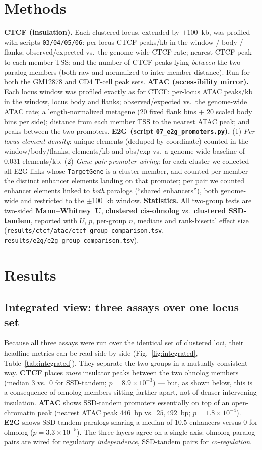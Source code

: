 \documentclass[11pt]{article}
\newcommand{\ohno}{\textcolor{ohno}{\textbf{clustered cis-ohnolog}}}
\newcommand{\ssd}{\textcolor{ssd}{\textbf{clustered SSD-tandem}}}
\begin{document}
\section{Methods}
\textbf{CTCF (insulation).} Each clustered locus, extended by $\pm$100~kb, was profiled with scripts
\texttt{03/04/05/06}: per-locus CTCF peaks/kb in the window / body / flanks; observed/expected vs.\
the genome-wide CTCF rate; nearest CTCF peak to each member TSS; and the number of CTCF peaks lying
\emph{between} the two paralog members (both raw and normalized to inter-member distance). Run for
both the GM12878 and CD4 T-cell peak sets.
\textbf{ATAC (accessibility mirror).} Each locus window was profiled exactly as for CTCF: per-locus
ATAC peaks/kb in the window, locus body and flanks; observed/expected vs.\ the genome-wide ATAC
rate; a length-normalized metagene ($20$ fixed flank bins $+$ $20$ scaled body bins per side);
distance from each member TSS to the nearest ATAC peak; and peaks between the two promoters.
\textbf{E2G (script \texttt{07\_e2g\_promoters.py}).} (1) \emph{Per-locus element density}: unique
elements (deduped by coordinate) counted in the window/body/flanks, elements/kb and obs/exp vs.\ a
genome-wide baseline of $0.031$ elements/kb. (2) \emph{Gene-pair promoter wiring}: for each cluster
we collected all E2G links whose \texttt{TargetGene} is a cluster member, and counted per member the
distinct enhancer elements landing on that promoter; per pair we counted enhancer elements linked to
\emph{both} paralogs (``shared enhancers''), both genome-wide and restricted to the $\pm$100~kb
window. \textbf{Statistics.} All two-group tests are two-sided \textbf{Mann--Whitney~U},
\ohno{} vs.\ \ssd{}, reported with $U$, $p$, per-group $n$, medians and rank-biserial effect size
(\texttt{results/ctcf/atac/ctcf\_group\_comparison.tsv}, \texttt{results/e2g/e2g\_group\_comparison.tsv}).

\section{Results}

\subsection{Integrated view: three assays over one locus set}
Because all three assays were run over the identical set of clustered loci, their headline metrics
can be read side by side (Fig.~\ref{fig:integrated}, Table~\ref{tab:integrated}). They separate the
two groups in a mutually consistent way. \textbf{CTCF} places \emph{more} insulator peaks between the
two ohnolog members (median $3$ vs.\ $0$ for SSD-tandem; $p=8.9\times10^{-3}$) --- but, as shown
below, this is a consequence of ohnolog members sitting farther apart, not of denser intervening
insulation. \textbf{ATAC} shows SSD-tandem promoters essentially on top of an open-chromatin peak
(nearest ATAC peak $446$~bp vs.\ $25{,}492$~bp; $p=1.8\times10^{-4}$). \textbf{E2G} shows SSD-tandem
paralogs sharing a median of $10.5$ enhancers versus $0$ for ohnolog ($p=3.3\times10^{-5}$). The
three layers agree on a single axis: ohnolog paralog pairs are wired for regulatory
\emph{independence}, SSD-tandem pairs for \emph{co-regulation}.
\end{document}
